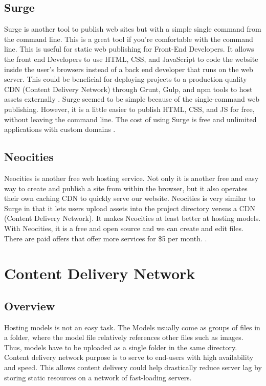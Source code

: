 \subsection{Surge}
Surge is another tool to publish web sites but with a simple single command from the command line. This is a great tool if you’re comfortable with the command line. This is useful for static web publishing for Front-End Developers. It allows the front end Developers to use HTML, CSS, and JavaScript to code the website inside the user's browsers instead of a back end developer that runs on the web server. This could be beneficial for deploying projects to a production-quality CDN (Content Delivery Network) through Grunt, Gulp, and npm tools to host assets externally \cite{skillcrush}. Surge seemed to be simple because of the single-command web publishing. However, it is a little easier to publish HTML, CSS, and JS for free, without leaving the command line. The cost of using Surge is free and unlimited applications with custom domains \cite{aframe}.

\subsection{Neocities}
Neocities is another free web hosting service. Not only it is another free and easy way to create and publish a site from within the browser, but it also operates their own caching CDN to quickly serve our website. Neocities is very similar to Surge in that it lets users upload assets into the project directory versus a CDN (Content Delivery Network). It makes Neocities at least better at hosting models. With Neocities, it is a free and open source and we can create and edit files. There are paid offers that offer more services for \$5 per month. \cite{aframe}. 

\section{Content Delivery Network}
\subsection{Overview}
Hosting models is not an easy task. The Models usually come as groups of files in a folder, where the model file relatively references other files such as images. Thus, models have to be uploaded as a single folder in the same directory. Content delivery network purpose is to serve to end-users with high availability and speed. This allows content delivery could help drastically reduce server lag by storing static resources on a network of fast-loading servers.

